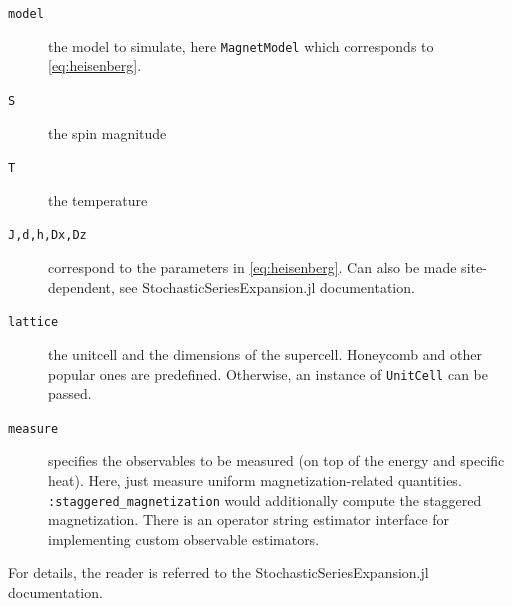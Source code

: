 \documentclass{SciPost}
\begin{document}
\begin{description}
\item[\texttt{model}] the model to simulate, here \texttt{MagnetModel} which corresponds to \cref{eq:heisenberg}.
\item[\texttt{S}] the spin magnitude
\item[\texttt{T}] the temperature
\item[\texttt{J,d,h,Dx,Dz}] correspond to the parameters in \cref{eq:heisenberg}. Can also be made site-dependent, see StochasticSeriesExpansion.jl documentation.
\item[\texttt{lattice}] the unitcell and the dimensions of the supercell. Honeycomb and other popular ones are predefined. Otherwise, an instance of \texttt{UnitCell} can be passed.
\item[\texttt{measure}] specifies the observables to be measured (on top of the energy and specific heat). Here, just measure uniform magnetization-related quantities. \texttt{:staggered\_{}magnetization} would additionally compute the staggered magnetization. There is an operator string estimator interface for implementing custom observable estimators.
\end{description}
For details, the reader is referred to the StochasticSeriesExpansion.jl documentation.
\end{document}
